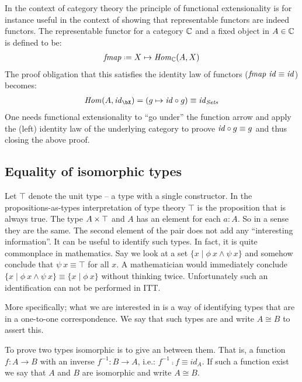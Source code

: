 \documentclass{article}
\begin{document}
In the context of category theory the principle of functional extensionality is
for instance useful in the context of showing that representable functors are
indeed functors. The representable functor for a category $\mathbb{C}$ and a fixed
object in $A \in \mathbb{C}$ is defined to be:
%
\begin{align*}
\fmap \defeq X \mapsto \Hom_{\bC}(A, X)
\end{align*}
%
The proof obligation that this satisfies the identity law of functors
($\mathit{fmap}\ \mathit{id} \equiv \mathit{id}$) becomes:
%
\begin{align*}
\Hom(A, \idFun_{\bX}) = (g \mapsto \idFun \comp g) \equiv \idFun_{\Sets}
\end{align*}
%
One needs functional extensionality to ``go under'' the function arrow and apply
the (left) identity law of the underlying category to proove $\mathit{id} \circ g
\equiv g$ and thus closing the above proof.
%
\iffalse
I also want to talk about:
\begin{itemize}
\item
  Foundational systems
\item
  Theory vs. metatheory
\item
  Internal type theory
\end{itemize}
\fi
\subsection{Equality of isomorphic types}
%
Let $\top$ denote the unit type -- a type with a single constructor. In the
propositions-as-types interpretation of type theory $\top$ is the proposition
that is always true. The type $A \times \top$ and $A$ has an element for each $a :
A$. So in a sense they are the same. The second element of the pair does not add
any ``interesting information''. It can be useful to identify such types. In
fact, it is quite commonplace in mathematics. Say we look at a set $\{x \mid
\phi\ x \land \psi\ x\}$ and somehow conclude that $\psi\ x \equiv \top$ for all
$x$. A mathematician would immediately conclude $\{x \mid \phi\ x \land
\psi\ x\} \equiv \{x \mid \phi\ x\}$ without thinking twice. Unfortunately such
an identification can not be performed in ITT.

More specifically; what we are interested in is a way of identifying types that
are in a one-to-one correspondence. We say that such types are
 and write $A \cong B$ to assert this.

To prove two types isomorphic is to give an  between them.
That is, a function $f : A \to B$ with an inverse $f^{-1} : B \to A$, i.e.:
$f^{-1} \comp f \equiv id_A$. If such a function exist we say that $A$ and $B$
are isomorphic and write $A \cong B$.
\end{document}
